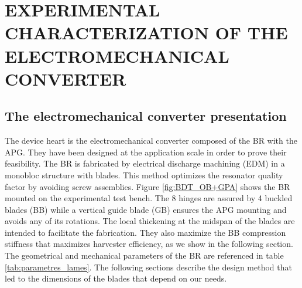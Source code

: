 \documentclass[3p,twocolumn,preprint]{elsarticle}
\begin{document}
\section{EXPERIMENTAL CHARACTERIZATION OF THE \mbox{ELECTROMECHANICAL} CONVERTER}
\label{sec:EXPERIMENTAL CHARACTERIZATIONS OF THE ELECTROMECHANICAL CONVERTER}
	\subsection{The electromechanical converter presentation}	
	\label{The electromechanical converter presentation}
The device heart is the electromechanical converter composed of the BR with the APG. They have been designed at the application scale in order to prove their feasibility. The BR is fabricated by electrical discharge machining (EDM) in a monobloc structure with blades. This method optimizes the resonator quality factor by avoiding screw assemblies. Figure \ref{fig:BDT_OB+GPA} shows the BR mounted on the experimental test bench. The 8 hinges are assured by 4 buckled blades (BB) while a vertical guide blade (GB) ensures the APG mounting and avoids any of its rotations. The local thickening at the midspan of the blades are intended to facilitate the fabrication. They also maximize the BB compression stiffness that maximizes harvester efficiency, as we show in the following section. The geometrical and mechanical parameters of the BR are referenced in table \ref{tab:parametres_lames}. The following sections describe the design method that led to the dimensions of the blades that depend on our needs.
\end{document}
